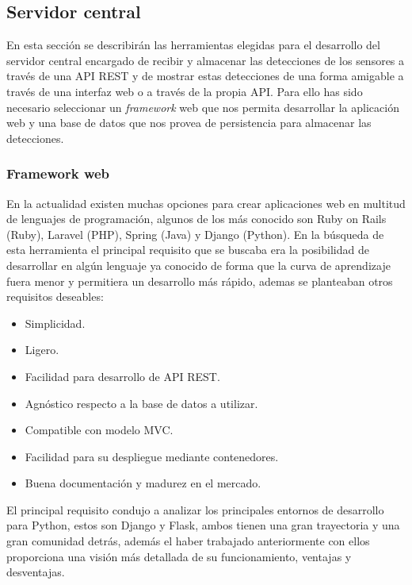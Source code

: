 \documentclass[../proyecto.tex]{subfiles}
\begin{document}
\subsection{Servidor central}

En esta sección se describirán las herramientas elegidas para el desarrollo del servidor central encargado de recibir y almacenar las detecciones de los sensores a través de una API REST y de mostrar estas detecciones de una forma amigable a través de una interfaz web o a través de la propia API. Para ello has sido necesario seleccionar un \textit{framework} web que nos permita desarrollar la aplicación web y una base de datos que nos provea de persistencia para almacenar las detecciones.

\subsubsection{Framework web}

En la actualidad existen muchas opciones para crear aplicaciones web en multitud de lenguajes de programación, algunos de los más conocido son Ruby on Rails (Ruby), Laravel (PHP), Spring (Java) y Django (Python). En la búsqueda de esta herramienta el principal requisito que se buscaba era la posibilidad de desarrollar en algún lenguaje ya conocido de forma que la curva de aprendizaje fuera menor y permitiera un desarrollo más rápido, ademas se planteaban otros requisitos deseables:

\begin{itemize}
  \item Simplicidad.
  \item Ligero.
  \item Facilidad para desarrollo de API REST.
  \item Agnóstico respecto a la base de datos a utilizar.
  \item Compatible con modelo MVC.
  \item Facilidad para su despliegue mediante contenedores.
  \item Buena documentación y madurez en el mercado.
\end{itemize}

El principal requisito condujo a analizar los principales entornos de desarrollo para Python, estos son Django y Flask, ambos tienen una gran trayectoria y una gran comunidad detrás, además el haber trabajado anteriormente con ellos proporciona una visión más detallada de su funcionamiento, ventajas y desventajas.\\
\end{document}
